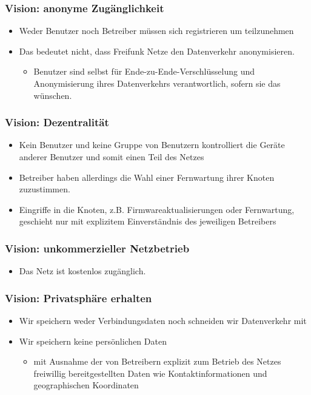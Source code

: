 \documentclass[handout]{beamer}
\begin{document}
\begin{frame}
	\frametitle{Vision: anonyme Zugänglichkeit}
	
	\begin{itemize}[<+->]
		\item Weder Benutzer noch Betreiber müssen sich registrieren um teilzunehmen
		\item Das bedeutet nicht, dass Freifunk Netze den Datenverkehr anonymisieren.
			\begin{itemize}
				\item Benutzer sind selbst für Ende-zu-Ende-Verschlüsselung und Anonymisierung ihres Datenverkehrs verantwortlich, sofern sie das wünschen.
			\end{itemize}
	\end{itemize}
\end{frame}

\begin{frame}
	\frametitle{Vision: Dezentralität}
	
	\begin{itemize}[<+->]
		\item Kein Benutzer und keine Gruppe von Benutzern kontrolliert die Geräte anderer Benutzer und somit einen Teil des Netzes
		\item Betreiber haben allerdings die Wahl einer Fernwartung ihrer Knoten zuzustimmen.
		\item Eingriffe in die Knoten, z.B. Firmwareaktualisierungen oder Fernwartung, geschieht nur mit explizitem Einverständnis des jeweiligen Betreibers
	\end{itemize}
\end{frame}

\begin{frame}
	\frametitle{Vision: unkommerzieller Netzbetrieb}
	
	\begin{itemize}[<+->]
		\item Das Netz ist kostenlos zugänglich.
	\end{itemize}
\end{frame}

\begin{frame}
	\frametitle{Vision: Privatsphäre erhalten}
	
	\begin{itemize}[<+->]
		\item Wir speichern weder Verbindungsdaten noch schneiden wir Datenverkehr mit
		\item Wir speichern keine persönlichen Daten
		\begin{itemize}
			\item mit Ausnahme der von Betreibern explizit zum Betrieb des Netzes freiwillig bereitgestellten Daten wie Kontaktinformationen und geographischen Koordinaten
		\end{itemize}
	\end{itemize}
\end{frame}
\end{document}
